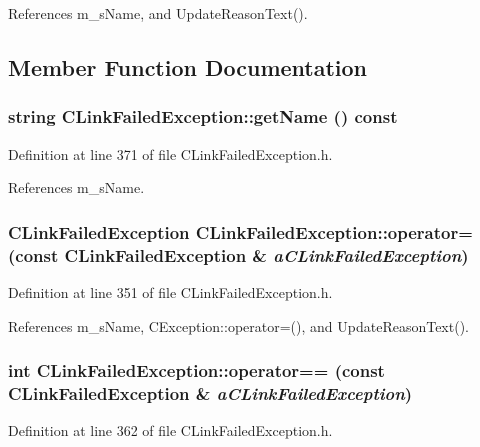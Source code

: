 References m\_\-s\-Name, and Update\-Reason\-Text().

\subsection{Member Function Documentation}
\subsubsection{\setlength{\rightskip}{0pt plus 5cm}string CLink\-Failed\-Exception::get\-Name () const\hspace{0.3cm}{\tt  [inline]}}\label{classCLinkFailedException_a10}




Definition at line 371 of file CLink\-Failed\-Exception.h.

References m\_\-s\-Name.
\subsubsection{\setlength{\rightskip}{0pt plus 5cm}CLink\-Failed\-Exception CLink\-Failed\-Exception::operator= (const CLink\-Failed\-Exception \& {\em a\-CLink\-Failed\-Exception})\hspace{0.3cm}{\tt  [inline]}}\label{classCLinkFailedException_a8}




Definition at line 351 of file CLink\-Failed\-Exception.h.

References m\_\-s\-Name, CException::operator=(), and Update\-Reason\-Text().
\subsubsection{\setlength{\rightskip}{0pt plus 5cm}int CLink\-Failed\-Exception::operator== (const CLink\-Failed\-Exception \& {\em a\-CLink\-Failed\-Exception})\hspace{0.3cm}{\tt  [inline]}}\label{classCLinkFailedException_a9}




Definition at line 362 of file CLink\-Failed\-Exception.h.

